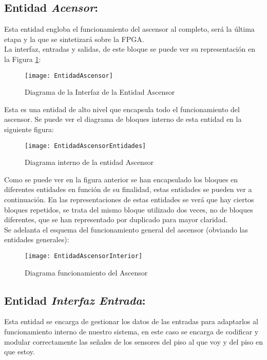 ﻿\subsection{Entidad \textit{Acensor}:} \label{bloque:Ascensor}
    Esta entidad engloba el funcionamiento del ascensor al completo, será la última etapa y la que se sintetizará sobre la FPGA.\\

    La interfaz, entradas y salidas, de este bloque se puede ver su representación en la Figura \ref{fig:EntidadIAscensor}:
    
    \begin{figure}[H]
		    \centering
		    \texttt{[image: EntidadAscensor]}
		    \caption{Diagrama de la Interfaz de la Entidad Ascensor}
		    \label{fig:EntidadIAscensor}
	\end{figure}
	
	Esta es una entidad de alto nivel que encapsula todo el funcionamiento del ascensor. Se puede ver el diagrama de bloques interno de esta entidad en la siguiente figura: 
	
	\begin{figure}[H]
		    \centering
		    \texttt{[image: EntidadAscensorEntidades]}
		    \caption{Diagrama interno de la entidad Ascensor}
		    \label{fig:EntidadIAscensorEntidades}
	\end{figure}
	
	Como se puede ver en la figura anterior se han encapsulado los bloques en diferentes entidades en función de su finalidad, estas entidades se pueden ver a continuación. En las representaciones de estas entidades se verá que hay ciertos bloques repetidos, se trata del mismo bloque utilizado dos veces, no de bloques diferentes, que se han representado por duplicado para mayor claridad. \\ 

	Se adelanta el esquema del funcionamiento general del ascensor (obviando las entidades generales):

	\begin{figure}[H]
		    \centering
		    \texttt{[image: EntidadAscensorInterior]}
		    \caption{Diagrama funcionamiento del Ascensor}
		    \label{fig:EntidadIAscensorInterior}
	\end{figure}

\subsection{Entidad \textit{Interfaz Entrada}:} \label{bloque:InterfazEntrada}
	Esta entidad se encarga de gestionar los datos de las entradas para adaptarlos al funcionamiento interno de nuestro sistema, en este caso se encarga de codificar y modular correctamente las señales de los sensores del piso al que voy y del piso en que estoy. \\ 

